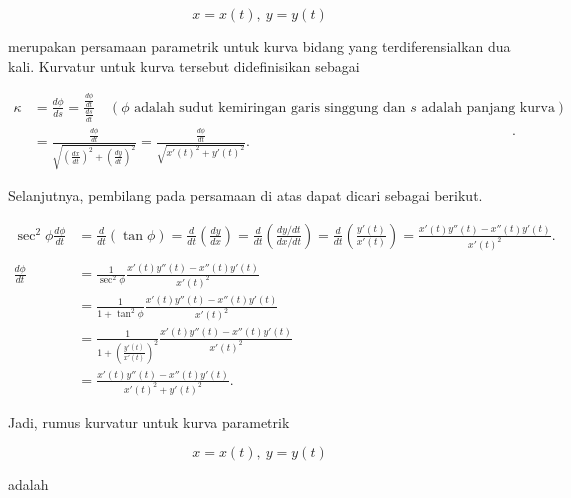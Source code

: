 \documentclass[a4paper,10pt]{article}
\begin{document}
\begin{eulernotebook}
\begin{eulercomment}
\begin{eulercomment}
\begin{eulercomment}
\begin{eulercomment}
\begin{eulercomment}
\end{eulercomment}
\begin{eulerformula}
\[
x = x(t),\ y= y(t)
\]
\end{eulerformula}
\begin{eulercomment}
merupakan persamaan parametrik untuk kurva bidang yang terdiferensialkan dua kali. Kurvatur untuk kurva tersebut didefinisikan
sebagai

\end{eulercomment}
\begin{eulerformula}
\[
\begin{aligned}\kappa &= \frac{d\phi}{ds}=\frac{\frac{d\phi}{dt}}{\frac{ds}{dt}}\quad (\phi \text{ adalah sudut kemiringan garis singgung dan }s \text{ adalah panjang kurva})\\ &=\frac{\frac{d\phi}{dt}}{\sqrt{(\frac{dx}{dt})^2+(\frac{dy}{dt})^2}}= \frac{\frac{d\phi}{dt}}{\sqrt{x'(t)^2+y'(t)^2}}.\end{aligned}.
\]
\end{eulerformula}
\begin{eulercomment}
Selanjutnya, pembilang pada persamaan di atas dapat dicari sebagai berikut.

\end{eulercomment}
\begin{eulerformula}
\[
\begin{aligned}\sec^2\phi\frac{d\phi}{dt} &= \frac{d}{dt}\left(\tan\phi\right)= \frac{d}{dt}\left(\frac{dy}{dx}\right)= \frac{d}{dt}\left(\frac{dy/dt}{dx/dt}\right)= \frac{d}{dt}\left(\frac{y'(t)}{x'(t)}\right)=\frac{x'(t)y''(t)-x''(t)y'(t)}{x'(t)^2}.\\ & \\ \frac{d\phi}{dt} &= \frac{1}{\sec^2\phi}\frac{x'(t)y''(t)-x''(t)y'(t)}{x'(t)^2}\\ &= \frac{1}{1+\tan^2\phi}\frac{x'(t)y''(t)-x''(t)y'(t)}{x'(t)^2}\\ &= \frac{1}{1+\left(\frac{y'(t)}{x'(t)}\right)^2}\frac{x'(t)y''(t)-x''(t)y'(t)}{x'(t)^2}\\ &= \frac{x'(t)y''(t)-x''(t)y'(t)}{x'(t)^2+y'(t)^2}.\end{aligned}
\]
\end{eulerformula}
\begin{eulercomment}
Jadi, rumus kurvatur untuk kurva parametrik

\end{eulercomment}
\begin{eulerformula}
\[
x=x(t),\ y=y(t)
\]
\end{eulerformula}
\begin{eulercomment}
adalah


\end{eulercomment}
\end{eulercomment}
\end{eulercomment}
\end{eulercomment}
\end{eulercomment}
\end{eulernotebook}
\end{document}

